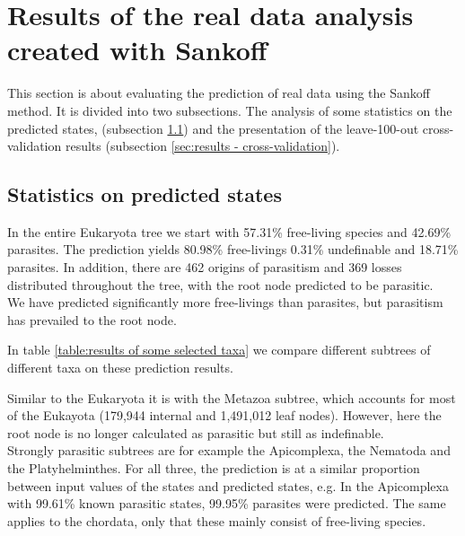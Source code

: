   \section{Results of the real data analysis created with Sankoff}
    This section is about evaluating the prediction of real data using the Sankoff method. It is 
      divided into two subsections. The analysis of some statistics on the predicted states, 
       (subsection \ref{subsec:results - statistics on predicted states}) and the presentation 
      of the leave-100-out cross-validation results (subsection \ref{sec:results - cross-validation}).
       \\

    \subsection{Statistics on predicted states} \label{subsec:results - statistics on predicted states}
      In the entire Eukaryota tree we start with 57.31\% free-living species and 42.69\% parasites. The 
        prediction yields 80.98\% free-livings 0.31\% undefinable and 18.71\% parasites. In addition, 
        there are 462 origins of parasitism and 369 losses distributed throughout the tree, with the 
        root node predicted to be parasitic. \\
      We have predicted significantly more free-livings than parasites, but parasitism has prevailed to 
        the root node.
      
      In table \ref{table:results of some selected taxa} we compare different subtrees of different taxa 
        on these prediction results.
      
      Similar to the Eukaryota it is with the Metazoa subtree, which accounts for most of the Eukayota 
        (179,944 internal and 1,491,012 leaf nodes). However, here the root node is no longer calculated 
        as parasitic but still as indefinable. \\
      Strongly parasitic subtrees are for example the Apicomplexa, the Nematoda and the Platyhelminthes. 
        For all three, the prediction is at a similar proportion between input values of the states and 
        predicted states, e.g. In the Apicomplexa with 99.61\% known parasitic states, 99.95\% parasites 
        were predicted. The same applies to the chordata, only that these mainly consist of free-living 
        species.
      
